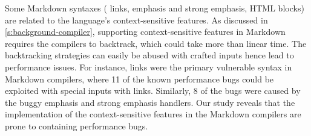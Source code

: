 Some Markdown syntaxes (\eg{,} links, emphasis and strong emphasis, HTML blocks) are related to the language's context-sensitive features.
%
%
%
As discussed in \autoref{s:background-compiler},
supporting context-sensitive features in Markdown requires the compilers to backtrack, which could take more than linear time.
%
The backtracking strategies can easily be abused with crafted inputs hence lead to performance issues.
%
For instance, links were the primary vulnerable syntax in Markdown compilers,
%
where 11 of the known performance bugs could be exploited with special inputs with links.
%
%
%
%
Similarly, 8 of the bugs were caused by the buggy emphasis and strong emphasis handlers.
%
Our study reveals that the implementation of the context-sensitive features in the Markdown compilers are prone to containing performance bugs.



